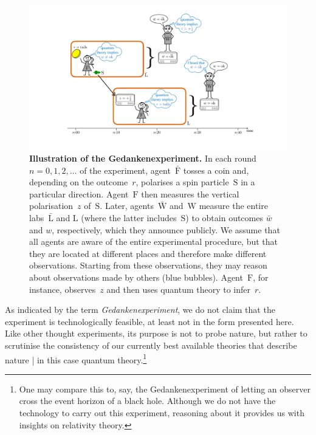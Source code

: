 \documentclass{article}
\theoremstyle{mystyle}
\theoremstyle{definition}
\newcommand*{\Friendone}{\mathrm{\bar{F}}}
\newcommand*{\Friendtwo}{\mathrm{F}}
\newcommand*{\Labone}{\mathrm{\bar{L}}}
\newcommand*{\Labtwo}{\mathrm{L}}
\newcommand*{\Assistant}{\mathrm{\bar{W}}}
\newcommand*{\Wigner}{\mathrm{W}}
\newcommand*{\Spin}{\mathrm{S}}
\newcommand*{\wb}{\bar{w}}
\begin{document}
 
\begin{figure}[t]
\centering
\includegraphics[trim= 0cm  4.2cm 0cm 2.3cm, clip=true, scale=0.2]{WFDiagramRW.pdf}
\caption{{\bf Illustration of the Gedankenexperiment.} In each round~$n = 0, 1, 2, \ldots$ of the experiment, agent~$\Friendone$ tosses a coin and, depending on the outcome~$r$, polarises a spin particle~$\Spin$ in a particular direction.  Agent~$\Friendtwo$ then measures the vertical polarisation~$z$ of~$\Spin$. Later, agents~$\Assistant$ and~$\Wigner$ measure the entire labs~$\Labone$ and $\Labtwo$ (where the latter includes~$\Spin$) to obtain outcomes $\wb$ and $w$, respectively, which they announce publicly. We assume that all agents are aware of the entire experimental procedure, but that they are located at different places and therefore make different observations.  Starting from these observations, they may reason about observations made by others (blue bubbles).  Agent~$\Friendtwo$, for instance, observes~$z$ and then uses quantum theory to infer~$r$. \vspace{-1.4ex}
\label{fig_EWF}
}
\end{figure}

As indicated by the term \emph{Gedankenexperiment}, we do not claim that the experiment is technologically feasible, at least not in the form presented here. Like other thought experiments, its purpose is not to probe nature, but rather to scrutinise the consistency of our currently best available theories that describe nature | in this case quantum theory.\footnote{One may compare this to, say, the Gedankenexperiment of letting an observer cross the event horizon of a black hole. Although we do not have the technology to carry out this experiment, reasoning about it provides us with insights on relativity theory.}
\end{document}

